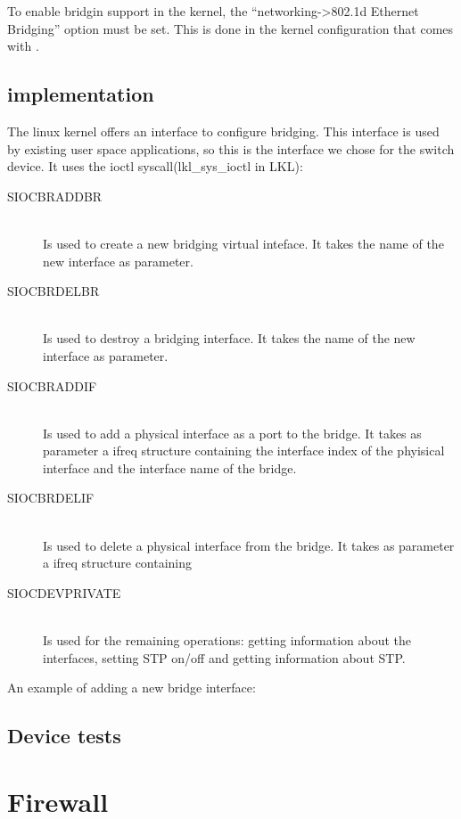 To enable bridgin support in the kernel, the ``networking->802.1d Ethernet Bridging'' option
must be set. This is done in the kernel configuration that comes with \textbf{\project}.

\subsection{\text{\project} implementation}
\label{sub-sec:switch-lkl}

The linux kernel offers an interface to configure bridging. This interface is used
by existing user space applications, so this is the interface we chose for the switch device. 
It uses the ioctl syscall(lkl_sys_ioctl in LKL):
\begin{description}
  \item[SIOCBRADDBR] \hfill \\
  Is used to create a new bridging virtual inteface. It takes the name of the new interface as parameter.
  \item[SIOCBRDELBR] \hfill \\
  Is used to destroy a bridging interface. It takes the name of the new interface as parameter.
  \item[SIOCBRADDIF] \hfill \\
  Is used to add a physical interface as a port to the bridge. It takes as parameter a ifreq structure containing
the interface index of the phyisical interface and the interface name of the bridge.
  \item[SIOCBRDELIF] \hfill \\
  Is used to delete a physical interface from the bridge. It takes as parameter a ifreq structure containing
  \item[SIOCDEVPRIVATE] \hfill \\
  Is used for the remaining operations: getting information about the interfaces, setting STP on/off and getting information
about STP.
\end{description}
An example of adding a new bridge interface:

\lstset{language=C,caption=Add bridge,label=lst:cbridgeadd}


\subsection{Device tests}
\label{sub-sec:switch-tests}

\section{Firewall}
\label{sub-sec:firewall-impl}

